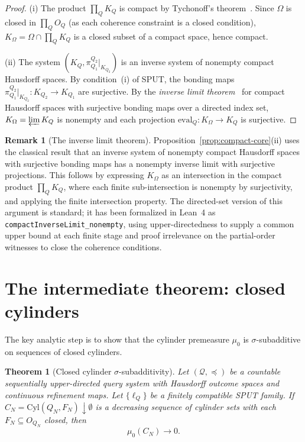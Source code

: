 \documentclass[11pt]{article}
\newtheorem{theorem}{Theorem}
\theoremstyle{definition}
\newtheorem{remark}{Remark}
\newcommand{\Qcal}{\mathcal{Q}}
\begin{document}
\begin{proof}
(i) The product $\prod_Q K_Q$ is compact by Tychonoff's theorem~\cite{Bourbaki1966}.
Since $\Omega$ is closed in $\prod_Q O_Q$ (as each coherence
constraint is a closed condition), $K_\Omega = \Omega \cap \prod_Q
K_Q$ is a closed subset of a compact space, hence compact.

(ii) The system $(K_Q, \pi^{Q_2}_{Q_1}|_{K_{Q_2}})$ is an inverse
system of nonempty compact Hausdorff spaces.  By condition~(i) of
SPUT, the bonding maps $\pi^{Q_2}_{Q_1}|_{K_{Q_2}} : K_{Q_2} \to
K_{Q_1}$ are surjective.  By the \emph{inverse limit theorem}~\cite{Bourbaki1966,Fremlin2003} for
compact Hausdorff spaces with surjective bonding maps over a directed
index set, $K_\Omega = \varprojlim K_Q$ is nonempty and each
projection $\mathrm{eval}_Q : K_\Omega \to K_Q$ is surjective.
\end{proof}

\begin{remark}[The inverse limit theorem]
Proposition~\ref{prop:compact-core}(ii) uses the classical result
that an inverse system of nonempty compact Hausdorff spaces with
surjective bonding maps has a nonempty inverse limit with surjective
projections.  This follows by expressing $K_\Omega$ as an
intersection in the compact product $\prod_Q K_Q$, where each finite
sub-intersection is nonempty by surjectivity, and applying the
finite intersection property.  The directed-set version of this
argument is standard; it has been formalized in Lean~4 as
\texttt{compactInverseLimit\_nonempty}, using upper-directedness to
supply a common upper bound at each finite stage and proof irrelevance
on the partial-order witnesses to close the coherence conditions.
\end{remark}

\section{The intermediate theorem: closed cylinders}\label{sec:closed}

The key analytic step is to show that the cylinder premeasure
$\mu_0$ is $\sigma$-subadditive on sequences of closed cylinders.

\begin{theorem}[Closed cylinder $\sigma$-subadditivity]
\label{thm:closed-cylinders}
Let $(\Qcal, \preceq)$ be a countable sequentially upper-directed
query system with Hausdorff outcome spaces and continuous refinement
maps.  Let $\{\ell_Q\}$ be a finitely compatible SPUT family.  If
$C_N = \mathrm{Cyl}(Q_N, F_N) \downarrow \emptyset$ is a decreasing
sequence of cylinder sets with each $F_N \subseteq O_{Q_N}$ closed,
then
\[
\mu_0(C_N) \to 0.
\]
\end{theorem}
\end{document}
